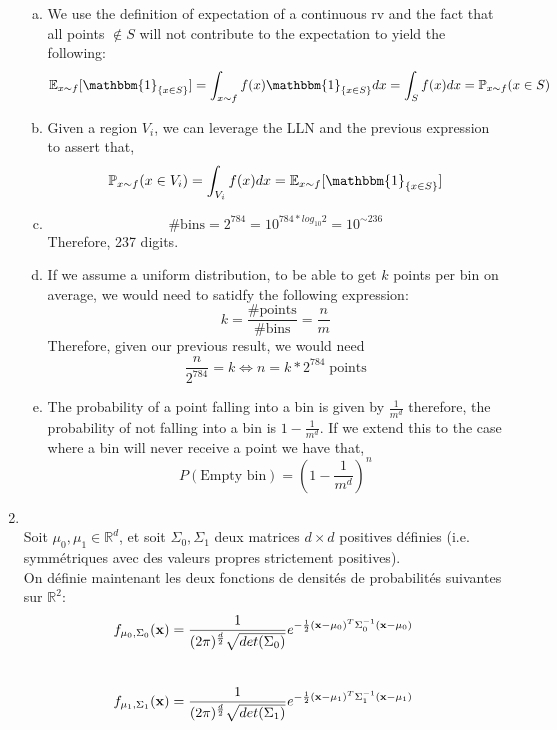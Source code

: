 \documentclass[11pt,french,english]{article}
\begin{document}
\begin{enumerate}
\begin{enumerate}[(a)]
    \item We use the definition of expectation of a continuous rv and the fact that all points $\notin S$ will not contribute to the expectation to yield the following: $$\mathbb{E}_{x\sim f}[\mathbbm{1}_{\{x \in S\}}] = \int_{x\sim f}f(x)\mathbbm{1}_{\{x \in S\}}dx = \int_{S}f(x)dx = \mathbb{P}_{x\sim f}(x \in S)$$
    \item Given a region $V_i$, we can leverage the LLN and the previous expression to assert that, $$\mathbb{P}_{x\sim f}(x \in V_i) = \int_{V_i}f(x)dx = \mathbb{E}_{x\sim f}[\mathbbm{1}_{\{x \in S\}}]$$
    \item $$\text{\# bins} = 2^{784} = 10^{784*log_{10}2} = 10^{\sim236}$$ Therefore, 237 digits.
    \item If we assume a uniform distribution, to be able to get $k$ points per bin on average, we would need to satidfy the following expression: $$k = \frac{\text{\# points}}{\text{\# bins}} = \frac{n}{m}$$ Therefore, given our previous result, we would need $$\frac{n}{2^{784}} = k \iff n = k*2^{784} \; \text{points}$$
    \item The probability of a point falling into a bin is given by $\frac{1}{m^d}$ therefore, the probability of not falling into a bin is $1 - \frac{1}{m^d}$. If we extend this to the case where a bin will never receive a point we have that, $$P(\text{Empty bin}) = \left(1-\frac{1}{m^d}\right)^n$$
\end{enumerate}


\item \textbf{} %
\\

{Soit $\mu_{0}, \mu_{1} \in \mathbb{R}^{d}$, et soit $\Sigma_{0}, \Sigma_{1}$ deux matrices $d \times d$ positives définies (i.e. symmétriques avec des valeurs propres strictement positives). \\
On définie maintenant les deux fonctions de densités de probabilités suivantes sur $\mathbb{R}^{2}$:} \\

$$f_{\mu_{0},\Sigma_{0}}(\mathbf{x})=\frac{1}{(2\pi)^{\frac{d}{2}}\sqrt{det(\Sigma_{0})}}e^{-\frac{1}{2}(\mathbf{x}-\mu_{0})^{T}\Sigma_{0}^{-1}(\mathbf{x}-\mu_{0})}$$ \\
$$f_{\mu_{1},\Sigma_{1}}(\mathbf{x})=\frac{1}{(2\pi)^{\frac{d}{2}}\sqrt{det(\Sigma_{1})}}e^{-\frac{1}{2}(\mathbf{x}-\mu_{1})^{T}\Sigma_{1}^{-1}(\mathbf{x}-\mu_{1})}$$


\end{enumerate}
\end{document}
